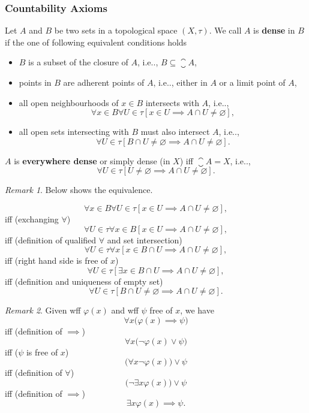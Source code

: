 \documentclass[12pt, letterpaper]{article}
\makeatletter
\newcommand\ie{i.e\@ifnextchar.{}{.\@}}
\renewcommand{\emptyset}{\varnothing}
\theoremstyle{definition}
\theoremstyle{remark}
\newtheorem*{rem*}{Remark}
\theoremstyle{definition}
\theoremstyle{plain}
\numberwithin{equation}{section}
\makeatother
\begin{document}
	\subsubsection{Countability Axioms}
	
	\begin{def*}[dense]
		Let $A$ and $B$ be two sets in a topological space $(X,\tau)$.
		We call $A$ is \textbf{dense} in $B$ if the one of following equivalent conditions holds
		\begin{itemize}
			\item $B$ is a subset of the closure of $A$, \ie, $B\subseteq\closure{A}$,
			\item points in $B$ are adherent points of $A$, \ie, either in $A$ or a limit point of $A$,
			\item all open neighbourhoods of $x\in B$ intersects with $A$, \ie,
			\[ \forall x\in B\forall U\in\tau[x\in  U \implies A\cap U\ne\emptyset ],\]
			\item all open sets intersecting with $B$ must also intersect $A$, \ie,
			\[ \forall U\in\tau[B\cap  U\ne\emptyset \implies A\cap U\ne\emptyset ].\]
		\end{itemize}
		 $A$ is \textbf{everywhere dense} or simply dense (in $X$) iff $\closure{A} = X$, \ie,
		 \[\forall U\in\tau[U\ne\emptyset\implies A\cap U\ne\emptyset ].\]
	\end{def*}
	\begin{rem*}
		Below shows the equivalence.
		
		\[ \forall x\in B\forall U\in\tau[x\in  U \implies A\cap U\ne\emptyset ],\]
		iff (exchanging $\forall$)
		\[ \forall U\in\tau\forall x\in B[x\in  U \implies A\cap U\ne\emptyset ],\]
		iff (definition of qualified $\forall$ and set intersection)
		\[ \forall U\in\tau\forall x[x\in B \cap  U \implies A\cap U\ne\emptyset ],\]
		iff (right hand side is free of $x$)
		\[ \forall U\in\tau[\exists x\in B \cap  U \implies A\cap U\ne\emptyset ],\]
		iff (definition and uniqueness of empty set)
		\[ \forall U\in\tau[B\cap  U\ne\emptyset \implies A\cap U\ne\emptyset ].\]
		
	\end{rem*}
	\begin{rem*}
		Given wff $\varphi(x)$ and wff $\psi$ free of $x$, we have
		\[ \forall x \big(\varphi(x) \implies \psi \big) \]
		iff (definition of $\implies$)
		\[ \forall x \big(\neg\varphi(x) \lor \psi \big) \]
		iff ($\psi$ is free of $x$)
		\[ \big(\forall x \neg\varphi(x)\big)  \lor \psi \]
		iff (definition of $\forall$)
		\[ \big(\neg\exists x \varphi(x)\big)  \lor \psi \]
		iff (definition of $\implies$)
		\[ \exists x \varphi(x) \implies \psi . \]
	\end{rem*}
	
\end{document}
